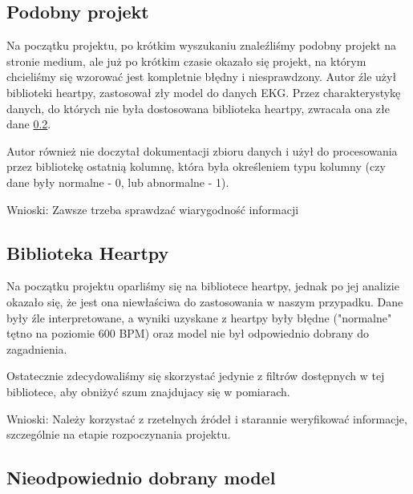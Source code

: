 \documentclass[12pt,a4paper]{article}
\begin{document}


\subsection{Podobny projekt}
Na początku projektu, po krótkim wyszukaniu znaleźliśmy podobny projekt na stronie medium, ale już po krótkim czasie okazało się projekt, na którym chcieliśmy się wzorować jest kompletnie błędny i niesprawdzony. Autor źle użył biblioteki heartpy, zastosował zły model do danych EKG. Przez charakterystykę danych, do których nie była dostosowana biblioteka heartpy, zwracała ona złe dane \ref{sec:wnioski-heartpy}.

Autor również nie doczytał dokumentacji zbioru danych i użył do procesowania przez bibliotekę ostatnią kolumnę, która była określeniem typu kolumny (czy dane były normalne - 0, lub abnormalne - 1).

Wnioski: Zawsze trzeba sprawdzać wiarygodność informacji

\subsection{Biblioteka Heartpy}
\label{sec:wnioski-heartpy}

Na początku projektu oparliśmy się na bibliotece heartpy, jednak po jej analizie okazało się, że jest ona niewłaściwa do zastosowania w naszym przypadku. Dane były źle interpretowane, a wyniki uzyskane z heartpy były błędne ("normalne"  tętno na poziomie 600 BPM) oraz model nie był odpowiednio dobrany do zagadnienia.

Ostatecznie zdecydowaliśmy się skorzystać jedynie z filtrów dostępnych w tej bibliotece, aby obniżyć szum znajdujacy się w pomiarach.

Wnioski: Należy korzystać z rzetelnych źródeł i starannie weryfikować informacje, szczególnie na etapie rozpoczynania projektu.

\subsection{Nieodpowiednio dobrany model}
\end{document}
